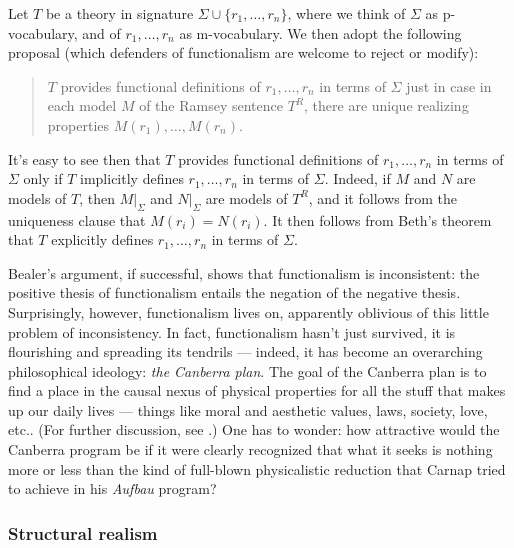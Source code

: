 Let $T$ be a theory in signature $\Sigma \cup \{r_1,\dots ,r_n \}$,
where we think of $\Sigma$ as p-vocabulary, and of $r_1,\dots ,r_n$ as
m-vocabulary.  We then adopt the following proposal (which defenders
of functionalism are welcome to reject or modify):
\begin{quote} $T$ provides functional definitions of $r_1,\dots ,r_n$
  in terms of $\Sigma$ just in case in each model $M$ of the Ramsey
  sentence $T^R$, there are unique realizing properties
  $M(r_1),\dots ,M(r_n)$. \end{quote} It's easy to see then that $T$
provides functional definitions of $r_1,\dots ,r_n$ in terms of
$\Sigma$ only if $T$ implicitly defines $r_1,\dots ,r_n$ in terms of
$\Sigma$.  Indeed, if $M$ and $N$ are models of $T$, then
$M|_{\Sigma}$ and $N|_{\Sigma}$ are models of $T^R$, and it follows
from the uniqueness clause that $M(r_i)=N(r_i)$.  It then follows from
Beth's theorem that $T$ explicitly defines $r_1,\dots ,r_n$ in terms
of $\Sigma$.

Bealer's argument, if successful, shows that functionalism is
inconsistent: the positive thesis of functionalism entails the
negation of the negative thesis.  Surprisingly, however, functionalism
lives on, apparently oblivious of this little problem of
inconsistency.  In fact, functionalism hasn't just survived, it is
flourishing and spreading its tendrils --- indeed, it has become an
overarching philosophical ideology: \emph{the Canberra plan}.  The
goal of the Canberra plan is to find a place in the causal nexus of
physical properties for all the stuff that makes up our daily lives
--- things like moral and aesthetic values, laws, society, love, etc..
(For further discussion, see \cite{menzies}.)  One has to wonder: how
attractive would the Canberra program be if it were clearly recognized
that what it seeks is nothing more or less than the kind of full-blown
physicalistic reduction that Carnap tried to achieve in his {\it
  Aufbau} program?



\subsubsection*{Structural realism}

